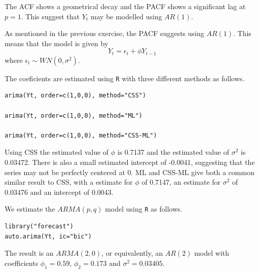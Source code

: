 \documentclass{article}
\theoremstyle{plain}
\theoremstyle{definition}
\newenvironment{exercise}[1]
  {\renewcommand\theexerciseaux{#1}\exerciseaux\label{ejer:#1}}
  {\endexerciseaux}
\newenvironment{sol}{\begin{trivlist}
 \item[\hskip \labelsep {\textit{Solution}.}\hskip \labelsep]}{\end{trivlist}}
\begin{document}
\begin{sol}

\end{sol}
\begin{exercise}{6}
\end{exercise}
\begin{sol}
The ACF shows a geometrical decay and the PACF shows a significant lag at $p=1$. This suggest that $Y_t$ may be modelled using $AR(1)$. 
\end{sol}
\begin{exercise}{7}
\end{exercise}
\begin{sol}
As mentioned in the previous exercise, the PACF suggests using $AR(1)$. This means that the model is given by 
\[
Y_t = \epsilon_t +\phi Y_{t-1}
\]
where $\epsilon_t\sim WN(0,\sigma^2)$. 

The coeficients are estimated using \texttt{R} with three different methods as follows.
\lstset{language=R,
showstringspaces=false,
tab=\rightarrowfill}
\begin{lstlisting}
arima(Yt, order=c(1,0,0), method="CSS")

arima(Yt, order=c(1,0,0), method="ML")

arima(Yt, order=c(1,0,0), method="CSS-ML")
\end{lstlisting}

Using CSS the estimated value of $\phi$ is 0.7137 and the estimated value of $\sigma^2$ is 0.03472. There is also a small estimated intercept of -0.0041, suggesting that the series may not be perfectly centered at 0. ML and CSS-ML give both a common similar result to CSS, with a estimate for $\phi$ of 0.7147, an estimate for $\sigma^2$ of 0.03476 and an intercept of 0.0043.
\end{sol}
\begin{exercise}{8}
\end{exercise}
\begin{sol}
We estimate the $ARMA(p,q)$ model using \texttt{R} as follows.
\lstset{language=R,
showstringspaces=false,
tab=\rightarrowfill}
\begin{lstlisting}
library("forecast")
auto.arima(Yt, ic="bic")
\end{lstlisting}
The result is an $ARMA(2,0)$, or equivalently, an $AR(2)$ model with coefficients $\phi_1 = 0.59$, $\phi_2 = 0.173$ and $\sigma^2=0.03405$. 
\end{sol}
\begin{exercise}{9}
\end{exercise}
\end{document}
